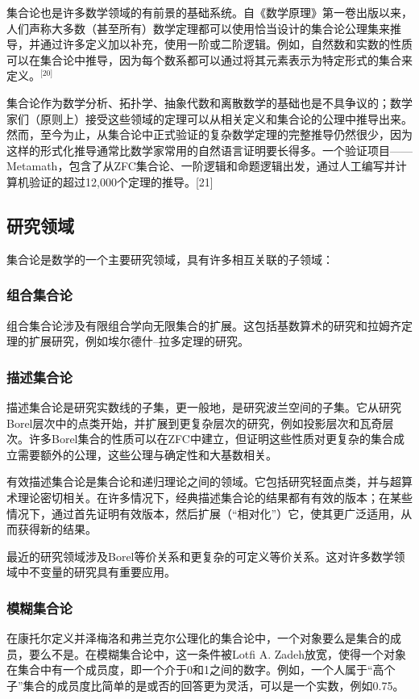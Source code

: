 集合论也是许多数学领域的有前景的基础系统。自《数学原理》第一卷出版以来，人们声称大多数（甚至所有）数学定理都可以使用恰当设计的集合论公理集来推导，并通过许多定义加以补充，使用一阶或二阶逻辑。例如，自然数和实数的性质可以在集合论中推导，因为每个数系都可以通过将其元素表示为特定形式的集合来定义。\(^\text{[20]}\)

集合论作为数学分析、拓扑学、抽象代数和离散数学的基础也是不具争议的；数学家们（原则上）接受这些领域的定理可以从相关定义和集合论的公理中推导出来。然而，至今为止，从集合论中正式验证的复杂数学定理的完整推导仍然很少，因为这样的形式化推导通常比数学家常用的自然语言证明要长得多。一个验证项目——Metamath，包含了从ZFC集合论、一阶逻辑和命题逻辑出发，通过人工编写并计算机验证的超过12,000个定理的推导。[21]
\subsection{研究领域}  
集合论是数学的一个主要研究领域，具有许多相互关联的子领域：
\subsubsection{组合集合论} 
组合集合论涉及有限组合学向无限集合的扩展。这包括基数算术的研究和拉姆齐定理的扩展研究，例如埃尔德什–拉多定理的研究。
\subsubsection{描述集合论 } 
描述集合论是研究实数线的子集，更一般地，是研究波兰空间的子集。它从研究Borel层次中的点类开始，并扩展到更复杂层次的研究，例如投影层次和瓦奇层次。许多Borel集合的性质可以在ZFC中建立，但证明这些性质对更复杂的集合成立需要额外的公理，这些公理与确定性和大基数相关。

有效描述集合论是集合论和递归理论之间的领域。它包括研究轻面点类，并与超算术理论密切相关。在许多情况下，经典描述集合论的结果都有有效的版本；在某些情况下，通过首先证明有效版本，然后扩展（“相对化”）它，使其更广泛适用，从而获得新的结果。
 
最近的研究领域涉及Borel等价关系和更复杂的可定义等价关系。这对许多数学领域中不变量的研究具有重要应用。
\subsubsection{模糊集合论} 
在康托尔定义并泽梅洛和弗兰克尔公理化的集合论中，一个对象要么是集合的成员，要么不是。在模糊集合论中，这一条件被Lotfi A. Zadeh放宽，使得一个对象在集合中有一个成员度，即一个介于0和1之间的数字。例如，一个人属于“高个子”集合的成员度比简单的是或否的回答更为灵活，可以是一个实数，例如0.75。
